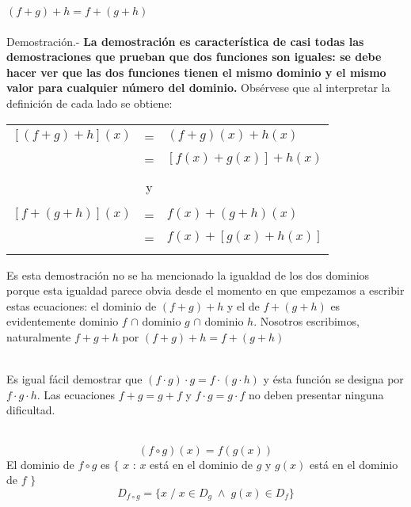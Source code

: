 \begin{teo}
    $(f+g)+h=f+(g+h)$\\\\
    Demostración.- \; \textbf{La demostración es característica de casi todas las demostraciones que prueban que dos funciones son iguales: se debe hacer ver que las dos funciones tienen el mismo dominio y el mismo valor para cualquier número del dominio.} Obsérvese que al interpretar la definición de cada lado se obtiene:
    \begin{center}
	\begin{tabular}{r c l}
	    $\left[ (f+g) + h \right](x)$&=&$(f+g)(x)+h(x)$\\
	    &=&$\left[ f(x) +g(x) \right] +h(x)$\\\\
	    &y&\\\\
	    $\left[ f+(g+h) \right](x)$&=&$f(x)+(g+h)(x)$\\
	    &=&$f(x)+\left[ g(x)+h(x) \right]$\\\\
	\end{tabular}
    \end{center}
    Es esta demostración no se ha mencionado la igualdad de los dos dominios porque esta igualdad parece obvia desde el momento en que empezamos a escribir estas ecuaciones: el dominio de $(f+g)+h$ y el de $f+(g+h)$ es evidentemente dominio $f$ $\cap$ dominio $g$ $\cap$ dominio $h$. Nosotros escribimos, naturalmente $f+g+h$ por $(f+g)+h=f+(g+h)$\\\\
\end{teo}

\begin{teo}
    Es igual fácil demostrar que $(f\cdot g)\cdot g=f\cdot (g \cdot h)$ y ésta función se designa por $f \cdot g \cdot h$. Las ecuaciones $f+g=g+f$ \; y \; $f\cdot g=g \cdot f$ no deben presentar ninguna dificultad.\\\\
\end{teo}

    \begin{def.}
	$$(f \circ g)(x)=f(g(x))$$
	El dominio de $f\circ g$ es $\lbrace $ $x$ : $x$ está en el dominio de $g$ \: y \; $g(x)$ está en el dominio de $f$ $\rbrace$
	$$D_{f \circ g}= \lbrace x \; / \; x \in D_g \; \land \; g(x)\in D_f \rbrace$$
    \end{def.}

